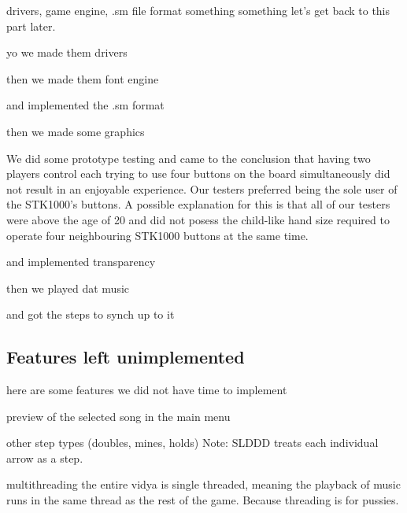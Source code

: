 drivers, game engine, .sm file format
something something let's get back to this part later.

yo we made them drivers

then we made them font engine

and implemented the .sm format

then we made some graphics

We did some prototype testing and came to the conclusion that having two players control each trying to use four buttons on the board simultaneously did not result in an enjoyable experience.
Our testers preferred being the sole user of the STK1000's buttons.
A possible explanation for this is that all of our testers were above the age of 20 and did not posess the child-like hand size required to operate four neighbouring STK1000 buttons at the same time.

and implemented transparency

then we played dat music

and got the steps to synch up to it

\subsection{Features left unimplemented}
	here are some features we did not have time to implement


	preview of the selected song in the main menu

	other step types (doubles, mines, holds)
		Note: SLDDD treats each individual arrow as a step. 

	multithreading
		the entire vidya is single threaded, meaning the playback of music runs in the same thread as the rest of the game. Because threading is for pussies.